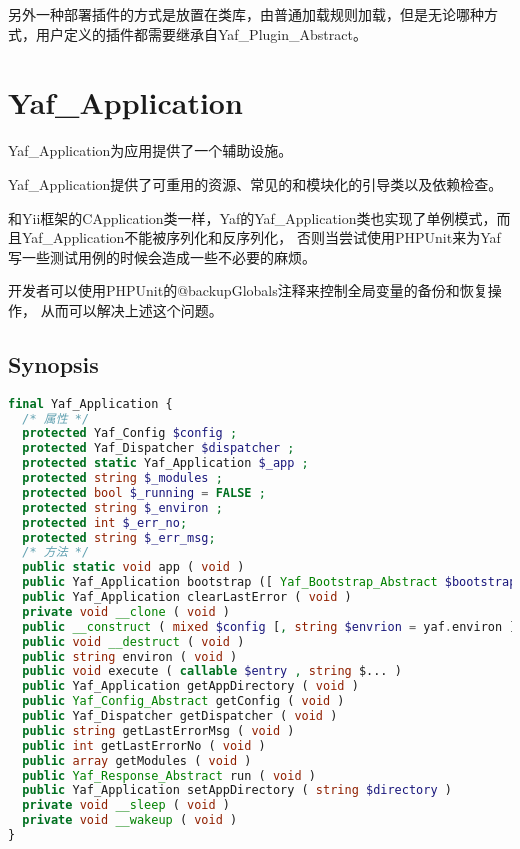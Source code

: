 另外一种部署插件的方式是放置在类库，由普通加载规则加载，但是无论哪种方式，用户定义的插件都需要继承自Yaf\_Plugin\_Abstract。


\chapter{Yaf\_Application}

Yaf\_Application为应用提供了一个辅助设施。



Yaf\_Application提供了可重用的资源、常见的和模块化的引导类以及依赖检查。

和Yii框架的CApplication类一样，Yaf的Yaf\_Application类也实现了单例模式，而且Yaf\_Application不能被序列化和反序列化， 否则当尝试使用PHPUnit来为Yaf写一些测试用例的时候会造成一些不必要的麻烦。

开发者可以使用PHPUnit的@backupGlobals注释来控制全局变量的备份和恢复操作， 从而可以解决上述这个问题。

\section{Synopsis}



\begin{lstlisting}[language=PHP]
final Yaf_Application {
  /* 属性 */
  protected Yaf_Config $config ;
  protected Yaf_Dispatcher $dispatcher ;
  protected static Yaf_Application $_app ;
  protected string $_modules ;
  protected bool $_running = FALSE ;
  protected string $_environ ;
  protected int $_err_no;
  protected string $_err_msg;
  /* 方法 */
  public static void app ( void )
  public Yaf_Application bootstrap ([ Yaf_Bootstrap_Abstract $bootstrap ] )
  public Yaf_Application clearLastError ( void )
  private void __clone ( void )
  public __construct ( mixed $config [, string $envrion = yaf.environ ] )
  public void __destruct ( void )
  public string environ ( void )
  public void execute ( callable $entry , string $... )
  public Yaf_Application getAppDirectory ( void )
  public Yaf_Config_Abstract getConfig ( void )
  public Yaf_Dispatcher getDispatcher ( void )
  public string getLastErrorMsg ( void )
  public int getLastErrorNo ( void )
  public array getModules ( void )
  public Yaf_Response_Abstract run ( void )
  public Yaf_Application setAppDirectory ( string $directory )
  private void __sleep ( void )
  private void __wakeup ( void )
}
\end{lstlisting}



